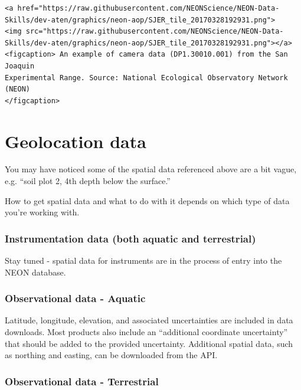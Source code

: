 \documentclass[]{book}
\begin{document}
\begin{verbatim}
<a href="https://raw.githubusercontent.com/NEONScience/NEON-Data-Skills/dev-aten/graphics/neon-aop/SJER_tile_20170328192931.png">
<img src="https://raw.githubusercontent.com/NEONScience/NEON-Data-Skills/dev-aten/graphics/neon-aop/SJER_tile_20170328192931.png"></a>
<figcaption> An example of camera data (DP1.30010.001) from the San Joaquin 
Experimental Range. Source: National Ecological Observatory Network (NEON) 
</figcaption>
\end{verbatim}

\hypertarget{geolocation-data}{%
\section{Geolocation data}\label{geolocation-data}}

You may have noticed some of the spatial data referenced above are a bit vague,
e.g. ``soil plot 2, 4th depth below the surface.''

How to get spatial data and what to do with it depends on which type of
data you're working with.

\hypertarget{instrumentation-data-both-aquatic-and-terrestrial}{%
\subsubsection{Instrumentation data (both aquatic and terrestrial)}\label{instrumentation-data-both-aquatic-and-terrestrial}}

Stay tuned - spatial data for instruments are in the process of entry into
the NEON database.

\hypertarget{observational-data---aquatic}{%
\subsubsection{Observational data - Aquatic}\label{observational-data---aquatic}}

Latitude, longitude, elevation, and associated uncertainties are included in
data downloads. Most products also include an ``additional coordinate uncertainty''
that should be added to the provided uncertainty. Additional spatial data, such
as northing and easting, can be downloaded from the API.

\hypertarget{observational-data---terrestrial}{%
\subsubsection{Observational data - Terrestrial}\label{observational-data---terrestrial}}
\end{document}

